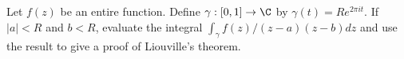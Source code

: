 Let $f(z)$ be an entire function. Define $\gamma:[0,1]\rightarrow \C$
by $\gamma(t)=Re^{2\pi it}$.  If $|a|<R$ and $b<R$, evaluate the
integral $\int_{\gamma} f(z)/(z-a)(z-b) dz$ and use the result to give
a proof of Liouville's theorem.
